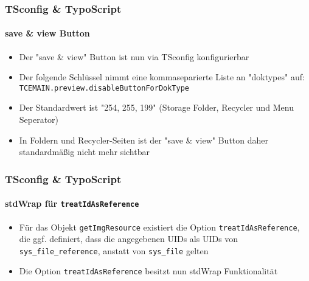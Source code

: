 \begin{frame}[fragile]
	\frametitle{TSconfig \& TypoScript}
	\framesubtitle{save \& view Button}

	\begin{itemize}

		\item Der "save \& view" Button ist nun via TSconfig konfigurierbar

		\item Der folgende Schlüssel nimmt eine kommaseparierte Liste an "doktypes" auf:
			\texttt{TCEMAIN.preview.disableButtonForDokType}

		\item Der Standardwert ist "254, 255, 199" (Storage Folder, Recycler und Menu Seperator)

		\item In Foldern und Recycler-Seiten ist der "save \& view" Button daher standardmäßig nicht mehr sichtbar

	\end{itemize}

\end{frame}

\begin{frame}[fragile]
	\frametitle{TSconfig \& TypoScript}
	\framesubtitle{stdWrap für \texttt{treatIdAsReference}}

	\begin{itemize}
		\item Für das Objekt \texttt{getImgResource} existiert die Option \texttt{treatIdAsReference},
			die ggf. definiert, dass die angegebenen UIDs als UIDs von \texttt{sys\_file\_reference},
			anstatt von \texttt{sys\_file} gelten

		\item Die Option \texttt{treatIdAsReference} besitzt nun stdWrap Funktionalität

	\end{itemize}

\end{frame}


